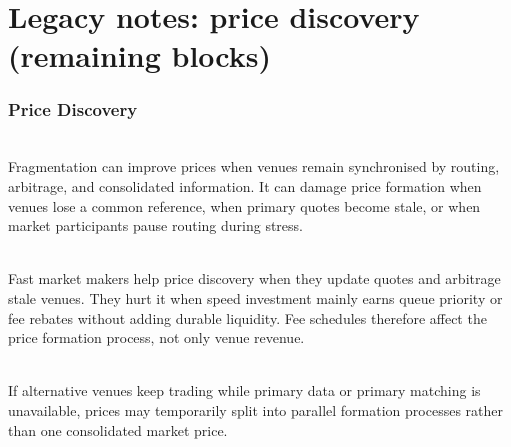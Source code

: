 \documentclass[a4paper,oneside,openany]{book}
\begin{document}
\chapter*{Legacy notes: price discovery (remaining blocks)}

\subsection*{Price Discovery}


\begin{mechanism} \\
Fragmentation can improve prices when venues remain synchronised by routing, arbitrage, and consolidated information. It can damage price formation when venues lose a common reference, when primary quotes become stale, or when market participants pause routing during stress.
\end{mechanism}

\begin{mechanism} \\
Fast market makers help price discovery when they update quotes and arbitrage stale venues. They hurt it when speed investment mainly earns queue priority or fee rebates without adding durable liquidity. Fee schedules therefore affect the price formation process, not only venue revenue.
\end{mechanism}

\begin{caveat} \\
If alternative venues keep trading while primary data or primary matching is unavailable, prices may temporarily split into parallel formation processes rather than one consolidated market price.
\end{caveat}
\end{document}
